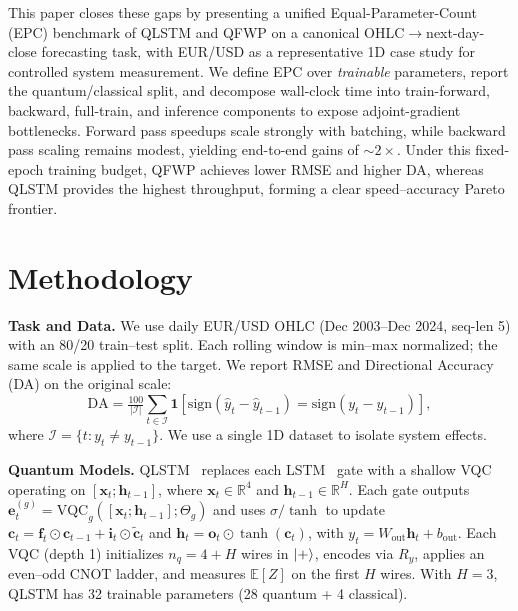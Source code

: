 \documentclass{article}
\begin{document}
This paper closes these gaps by presenting a unified Equal-Parameter-Count (EPC) benchmark of QLSTM and QFWP on a canonical OHLC$\rightarrow$next-day-close forecasting task, with EUR/USD as a representative 1D case study for controlled system measurement. We define EPC over \emph{trainable} parameters, report the quantum/classical split, and decompose wall-clock time into train-forward, backward, full-train, and inference components to expose adjoint-gradient bottlenecks. Forward pass speedups scale strongly with batching, while backward pass scaling remains modest, yielding end-to-end gains of $\sim 2\times$. Under this fixed-epoch training budget, QFWP achieves lower RMSE and higher DA, whereas QLSTM provides the highest throughput, forming a clear speed--accuracy Pareto frontier.

\section{Methodology}
\label{sec:methodology}

\textbf{Task and Data.}
We use daily EUR/USD OHLC (Dec 2003--Dec 2024, seq-len 5) with an 80/20 train--test split.
Each rolling window is min--max normalized; the same scale is applied to the target.
We report RMSE and Directional Accuracy (DA) on the original scale:
\[
\mathrm{DA}=\tfrac{100}{|\mathcal{I}|}\!\sum_{t\in\mathcal{I}}\!\mathbf{1}[\mathrm{sign}(\hat{y}_t-\hat{y}_{t-1})=\mathrm{sign}(y_t-y_{t-1})],
\]
where $\mathcal{I}=\{t:y_t\neq y_{t-1}\}$.
We use a single 1D dataset to isolate system effects.

\textbf{Quantum Models.}
QLSTM~\cite{chen2022quantum} replaces each LSTM~\cite{hochreiter1997long} gate with a shallow VQC~\cite{cerezo2021variational} operating on $[\mathbf{x}_t;\mathbf{h}_{t-1}]$, where $\mathbf{x}_t\!\in\!\mathbb{R}^4$ and $\mathbf{h}_{t-1}\!\in\!\mathbb{R}^H$.
Each gate outputs $\mathbf{e}_t^{(g)}=\mathrm{VQC}_g([\mathbf{x}_t;\mathbf{h}_{t-1}];\Theta_g)$ and uses $\sigma/\tanh$ to update
$\mathbf{c}_t=\mathbf{f}_t\odot\mathbf{c}_{t-1}+\mathbf{i}_t\odot\tilde{\mathbf{c}}_t$ and
$\mathbf{h}_t=\mathbf{o}_t\odot\tanh(\mathbf{c}_t)$, with $y_t=W_{\mathrm{out}}\mathbf{h}_t+b_{\mathrm{out}}$.
Each VQC (depth 1) initializes $n_q=4+H$ wires in $\ket{+}$, encodes via $R_y$, applies an even--odd CNOT ladder, and measures $\mathbb{E}[Z]$ on the first $H$ wires.
With $H=3$, QLSTM has 32 trainable parameters (28 quantum + 4 classical).
\end{document}

